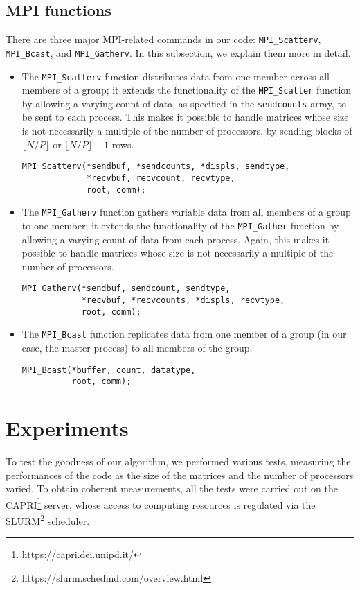 \documentclass[11pt]{article}
\begin{document}
\subsection{MPI functions}
There are three major MPI-related commands in our code: \verb|MPI_Scatterv|, \verb|MPI_Bcast|, and \verb|MPI_Gatherv|. In this subsection, we explain them more in detail.
\begin{itemize}
    \item The \verb|MPI_Scatterv| function distributes data from one member across all members of a group; it extends the functionality of the \verb|MPI_Scatter| function by allowing a varying count of data, as specified in the \verb|sendcounts| array, to be sent to each process. This makes it possible to handle matrices whose size is not necessarily a multiple of the number of processors, by sending blocks of $\lfloor N/P \rfloor$ or $\lfloor N/P \rfloor + 1$ rows.

    \begin{verbatim}
MPI_Scatterv(*sendbuf, *sendcounts, *displs, sendtype,
             *recvbuf, recvcount, recvtype,
             root, comm);
    \end{verbatim}
    

    \item The \verb|MPI_Gatherv| function gathers variable data from all members of a group to one member; it extends the functionality of the \verb|MPI_Gather| function by allowing a varying count of data from each process. Again, this makes it possible to handle matrices whose size is not necessarily a multiple of the number of processors. 

    \begin{verbatim}
MPI_Gatherv(*sendbuf, sendcount, sendtype,
            *recvbuf, *recvcounts, *displs, recvtype,
            root, comm);
    \end{verbatim}


    \item The \verb|MPI_Bcast| function replicates data from one member of a group (in our case, the master process) to all members of the group.

    \begin{verbatim}
MPI_Bcast(*buffer, count, datatype,
          root, comm);
    \end{verbatim}
\end{itemize}
    

\section{Experiments}
To test the goodness of our algorithm, we performed various tests, measuring the performances of the code as the size of the matrices and the number of processors varied. To obtain coherent measurements, all the tests were carried out on the CAPRI\footnote{https://capri.dei.unipd.it/} server, whose access to computing resources is regulated via the SLURM\footnote{https://slurm.schedmd.com/overview.html} scheduler.
\end{document}
